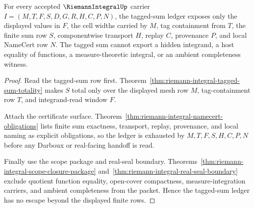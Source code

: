 \begin{theorem}
\label{thm:riemann-integral-tagged-sum-ledger-nonescape}
For every accepted $\RiemannIntegralUp$ carrier $I=(M,T,F,S,D,G,R,H,C,P,N)$, the tagged-sum ledger exposes only the displayed values in $F$, the cell widths carried by $M$, tag containment from $T$, the finite sum row $S$, componentwise transport $H$, replay $C$, provenance $P$, and local NameCert row $N$. The tagged sum cannot export a hidden integrand, a host equality of functions, a measure-theoretic integral, or an ambient completeness witness.
\end{theorem}
\begin{proof}
Read the tagged-sum row first. Theorem~\ref{thm:riemann-integral-tagged-sum-totality} makes $S$ total only over the displayed mesh row $M$, tag-containment row $T$, and integrand-read window $F$.

Attach the certificate surface. Theorem~\ref{thm:riemann-integral-namecert-obligations} lists finite sum exactness, transport, replay, provenance, and local naming as explicit obligations, so the ledger is exhausted by $M,T,F,S,H,C,P,N$ before any Darboux or real-facing handoff is read.

Finally use the scope package and real-seal boundary. Theorems~\ref{thm:riemann-integral-scope-closure-package} and~\ref{thm:riemann-integral-real-seal-boundary} exclude quotient function equality, open-cover compactness, measure-integration carriers, and ambient completeness from the packet. Hence the tagged-sum ledger has no escape beyond the displayed finite rows.
\end{proof}

